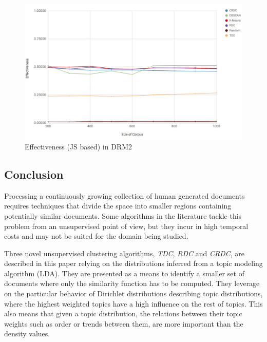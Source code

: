 \begin{figure}
  \includegraphics[scale=0.27]{effectivenessDRM2JS.png}
  \caption{Effectiveness (JS based) in DRM2}
  \label{fig:effectivenessDRM2JS}
\end{figure}
 


\subsection{Conclusion}
\label{sec:clustering-conclusion}

Processing a continuously growing collection of human generated documents requires techniques that divide the space into smaller regions containing potentially similar documents. Some algorithms in the literature tackle this problem from an unsupervised point of view, but they incur in high temporal costs and may not be suited for the domain being studied.

Three novel unsupervised clustering algorithms, \textit{TDC}, \textit{RDC} and \textit{CRDC}, are described in this paper relying on the distributions inferred from a topic modeling algorithm (LDA). They are presented as a means to identify a smaller set of documents where only the similarity function has to be computed. They leverage on the particular behavior of Dirichlet distributions describing topic distributions, where the highest weighted topics have a high influence on the rest of topics. This also means that given a topic distribution, the relations between their topic weights such as order or trends between them, are more important than the density values.

